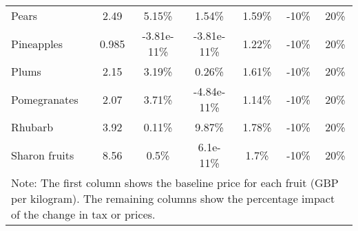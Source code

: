 \documentclass[11pt]{article}
\begin{document}
\begin{table}[h]
\begin{center}
{\begin{tabular}{lcccccc}
Pears &2.49 &5.15\% &1.54\% &1.59\% &-10\% &20\% \\
Pineapples &0.985 &-3.81e-11\% &-3.81e-11\% &1.22\% &-10\% &20\% \\
Plums &2.15 &3.19\% &0.26\% &1.61\% &-10\% &20\% \\
Pomegranates &2.07 &3.71\% &-4.84e-11\% &1.14\% &-10\% &20\% \\
\hline
Rhubarb &3.92 &0.11\% &9.87\% &1.78\% &-10\% &20\% \\
Sharon fruits &8.56 &0.5\% &6.1e-11\% &1.7\% &-10\% &20\% \\
 \hline \hline
\multicolumn{7}{p{1.0 \textwidth}}{Note: The first column shows the baseline price for each fruit (GBP per kilogram). The remaining columns show the percentage impact of the change in tax or prices.}
\end{tabular}}
\end{center}
\end{table}
\end{document}
